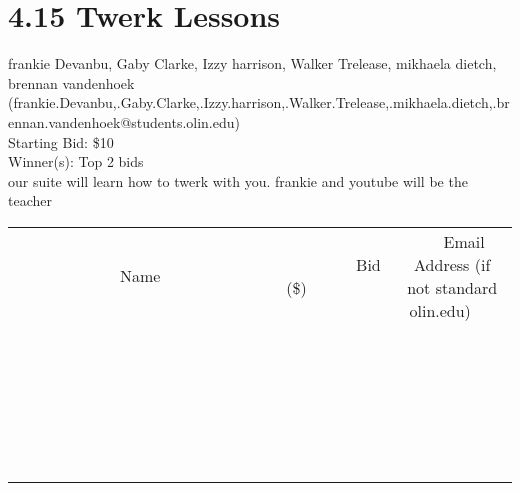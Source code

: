 \documentclass[11pt]{article}
\begin{document}
\section*{4.15 Twerk Lessons}
frankie Devanbu, Gaby Clarke, Izzy harrison, Walker Trelease, mikhaela dietch, brennan vandenhoek (frankie.Devanbu,.Gaby.Clarke,.Izzy.harrison,.Walker.Trelease,.mikhaela.dietch,.brennan.vandenhoek@students.olin.edu) \\
Starting Bid: \$10 \\
Winner(s): 
Top 2 bids \\
our suite will learn how to twerk with you. frankie and youtube will be the teacher \\[6ex]
\begin{tabular}{c c c}
~~~~~~~~~~~~~Name~~~~~~~~~~~~~ & ~~~~~~~~~Bid (\$)~~~~~~~~~ & ~~~Email Address (if not standard olin.edu)~~~ \\
 & & \\
\hline
 & & \\
\hline
 & & \\
\hline
 & & \\
\hline
 & & \\
\hline
 & & \\
\hline
 & & \\
\hline
 & & \\
\hline
 & & \\
\hline
 & & \\
\hline
 & & \\
\hline
 & & \\
\hline
 & & \\
\hline
 & & \\
\hline
 & & \\
\hline
 & & \\
\hline
 & & \\
\hline
 & & \\
\hline
 & & \\
\hline
 & & \\
\hline
 & & \\
\hline
 & & \\
\hline
 & & \\
\hline
 & & \\
\hline
 & & \\
\hline
 & & \\
\hline
\end{tabular}
\clearpage
\end{document}
